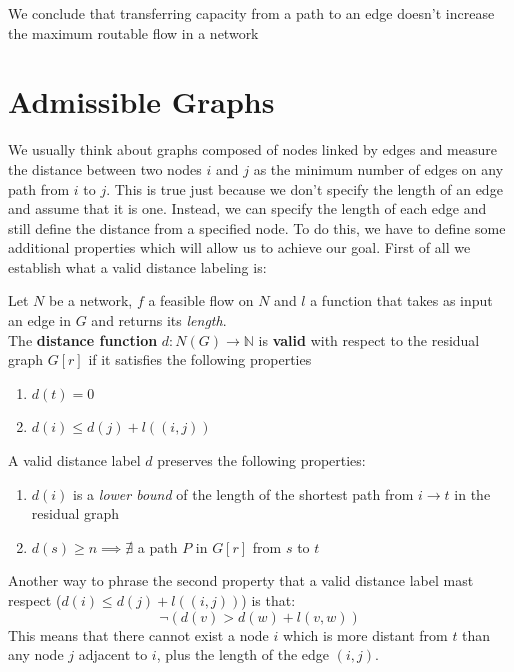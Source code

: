 We conclude that transferring capacity from a path to an edge doesn't increase the maximum routable flow in a network
\newpage
\section{Admissible Graphs}
We usually think about graphs composed of nodes linked by edges and measure the distance between two nodes $i$ and $j$ as the minimum number of edges on any path from $i$ to $j$. This is true just because we don't specify the length of an edge and assume that it is one. Instead, we can specify the length of each edge and still define the distance from a specified node. To do this, we have to define some additional properties which will allow us to achieve our goal.
First of all we establish what a valid distance labeling is:
\begin{definition}
    \label{VDL}
    Let $N$ be a network, $f$ a feasible flow on $N$ and $l$ a function that takes as input an edge in $G$ and returns its \textit{length}.\\
    The \textbf{distance function} $d: N(G) \rightarrow \mathbb{N}$ is \textbf{valid} with respect to the residual graph $G[r]$ if it satisfies the following properties 
    \begin{enumerate}
        \item $d(t) = 0$
        \item $d(i) \le d(j) + l((i,j))$
    \end{enumerate}
\end{definition}

\begin{obs}
    A valid distance label $d$ preserves the following properties:
    \begin{enumerate}
        \item $d(i)$ is a \textit{lower bound} of the length of the shortest path from $i \rightarrow t$
        in the residual graph
        \item $d(s) \ge n \implies \nexists$ a path $P$ in $G[r]$ from $s$ to $t$ 
    \end{enumerate}
    
\end{obs}
Another way to phrase the second property that a valid distance label mast respect ($d(i) \le d(j) + l((i,j))$) is that:
\[\neg (d(v) > d(w) + l(v,w))\]
This means that there cannot exist a node $i$ which is more distant from $t$ than any node $j$ adjacent to $i$, plus the length of the edge $(i,j)$.

